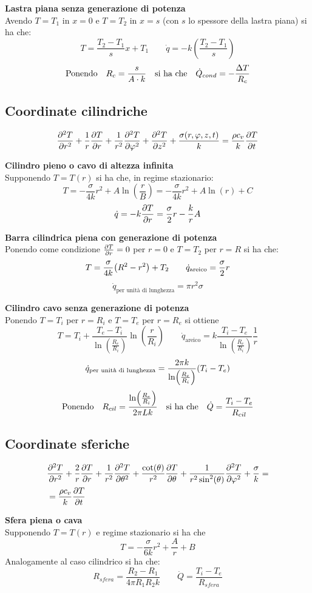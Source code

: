 \textbf{Lastra piana senza generazione di potenza}\\
Avendo $T=T_1$ in $x=0$ e $T = T_2$ in $x=s$ (con $s$ lo spessore della lastra piana) si ha che:
\[ T = \frac{T_2 - T_1}{s}x + T_1 \qquad \dot{q} = -k \left(\frac{T_2 - T_1}{s} \right) \]
\[\qq*{Ponendo} R_c = \frac{s}{A \cdot k} \qq{si ha che} \dot{Q}_{cond} = -\frac{\Delta T}{R_c}\]

\subsection{Coordinate cilindriche}
\[ \pdv[2]{T}{r} + \frac{1}{r}\pdv{T}{r} + \frac{1}{r^2}\pdv[2]{T}{\varphi} + \pdv[2]{T}{z} + \frac{\sigma(r,\varphi,z,t)}{k} = \frac{\rho c_v}{k} \pdv{T}{t} \]

\textbf{Cilindro pieno o cavo di altezza infinita}\\
Supponendo $T=T(r)$ si ha che, in regime stazionario:
\[T = -\frac{\sigma}{4k}r^2 + A\ln(\frac{r}{B}) = -\frac{\sigma}{4k}r^2 + A\ln(r) + C \]
\[\dot{q} = -k \pdv{T}{r} = \frac{\sigma}{2}r - \frac{k}{r}A \]

\textbf{Barra cilindrica piena con generazione di potenza}\\
Ponendo come condizione $\pdv{T}{r} = 0$ per $r = 0$ e $T = T_2$ per $r = R$ si ha che:
\[T = \frac{\sigma}{4k}\qty(R^2-r^2) + T_2 \qquad \dot{q}_{\text{areico}} = \frac{\sigma}{2}r \]
\[\dot{q}_{\text{per unità di lunghezza}} = \pi r^2 \sigma \]

\textbf{Cilindro cavo senza generazione di potenza}\\
Ponendo $T = T_i$ per $r = R_i$ e $T = T_e$ per $r = R_e$ si ottiene
\[T = T_i + \frac{T_e - T_i}{\ln(\frac{R_e}{R_i})}\ln(\frac{r}{R_i}) \qquad \dot{q}_{\text{areico}} = k \frac{T_i-T_e}{\ln(\frac{R_e}{R_i})}\frac{1}{r}\]
\[\dot{q}_{\text{per unità di lunghezza}} = \frac{2\pi k}{\ln(\frac{R_e}{R_i})}\qty(T_i - T_e) \]
\[\qq*{Ponendo} R_{cil} = \frac{\ln(\frac{R_e}{R_i})}{2\pi L k} \qq{si ha che} \dot{Q} = \frac{T_i-T_e}{R_{cil}}\]

\subsection{Coordinate sferiche}
\begin{align*}
    & \pdv[2]{T}{r} + \frac{2}{r}\pdv{T}{r} + \frac{1}{r^2}\pdv[2]{T}{\theta} + \frac{\cot(\theta)}{r^2}\pdv{T}{\theta} + \frac{1}{r^2 \sin^2(\theta)}\pdv[2]{T}{\varphi} + \frac{\sigma}{k} =\\
    & = \frac{\rho c_v}{k} \pdv{T}{t}
\end{align*}

\textbf{Sfera piena o cava}\\
Supponendo $T = T(r)$ e regime stazionario si ha che
\[ T = -\frac{\sigma}{6k}r^2 + \frac{A}{r} + B \]
Analogamente al caso cilindrico si ha che:
\[ R_{sfera} = \frac{R_2 - R_1}{4\pi R_1 R_2 k} \qquad \dot{Q} = \frac{T_i-T_e}{R_{sfera}} \]

